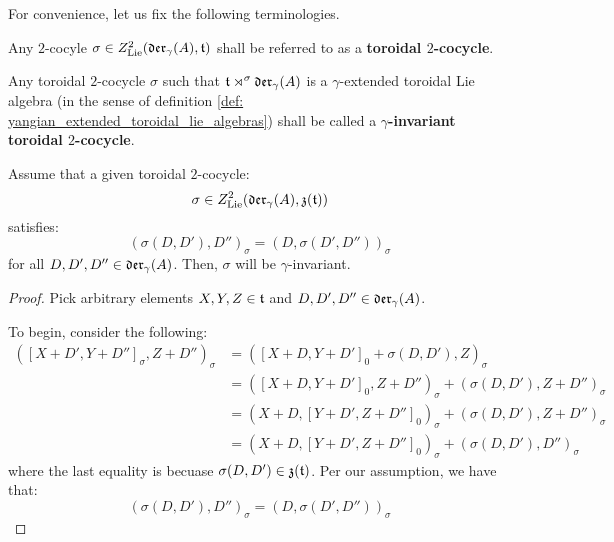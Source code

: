        For convenience, let us fix the following terminologies.
        \begin{definition} \label{def: yangian_toroidal_cocycles}
            Any $2$-cocyle $\sigma \in Z^2_{\mathrm{Lie}}(\mathfrak{der}_{\gamma}(A), \mathfrak{t})$ shall be referred to as a \textbf{toroidal $2$-cocycle}.
            
            Any toroidal $2$-cocycle $\sigma$ such that $\mathfrak{t} \rtimes^{\sigma} \mathfrak{der}_{\gamma}(A)$ is a $\gamma$-extended toroidal Lie algebra (in the sense of definition \ref{def: yangian_extended_toroidal_lie_algebras}) shall be called a \textbf{$\gamma$-invariant toroidal $2$-cocycle}.
        \end{definition}
        \begin{lemma}
            
        \end{lemma}
            \begin{lemma}
                
            \end{lemma}
        \begin{theorem} \label{theorem: yangian_criterion_for_toroidal_cocycles}
            Assume that a given toroidal $2$-cocycle:
                $$\sigma \in Z^2_{\mathrm{Lie}}(\mathfrak{der}_{\gamma}(A), \mathfrak{z}(\mathfrak{t}))$$
            satisfies:
                $$(\sigma(D, D'), D'')_{\sigma} = (D, \sigma(D', D''))_{\sigma}$$
            for all $D, D', D'' \in \mathfrak{der}_{\gamma}(A)$. Then, $\sigma$ will be $\gamma$-invariant.
        \end{theorem}
            \begin{proof}
                Pick arbitrary elements $X, Y, Z \in \mathfrak{t}$ and $D, D', D'' \in \mathfrak{der}_{\gamma}(A)$.
                
                To begin, consider the following:
                    $$
                        \begin{aligned}
                            ([X + D', Y + D'']_{\sigma}, Z + D'')_{\sigma} & = ([X + D, Y + D']_0 + \sigma(D, D'), Z)_{\sigma}
                            \\
                            & = ([X + D, Y + D']_0, Z + D'')_{\sigma} + (\sigma(D, D'), Z + D'')_{\sigma}
                            \\
                            & = (X + D, [Y + D', Z + D'']_0)_{\sigma} + (\sigma(D, D'), Z + D'')_{\sigma}
                            \\
                            & = (X + D, [Y + D', Z + D'']_0)_{\sigma} + (\sigma(D, D'), D'')_{\sigma}
                        \end{aligned}
                    $$
                where the last equality is becuase $\sigma(D, D') \in \mathfrak{z}(\mathfrak{t})$. Per our assumption, we have that:
                    $$(\sigma(D, D'), D'')_{\sigma} = (D, \sigma(D', D''))_{\sigma}$$
                
            \end{proof}